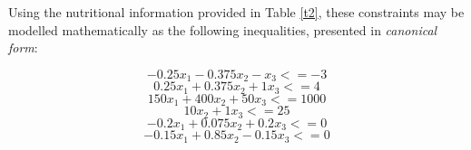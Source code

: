 \documentclass[11pt, a4paper]{article}
\begin{document}
    Using the nutritional information provided in Table \ref{t2}, these constraints may be modelled mathematically as the following inequalities, presented in \textit{canonical form}:

    $$-0.25x_1 - 0.375x_2 - x_3 <= -3$$
    $$0.25x_1 + 0.375x_2 + 1x_3 <= 4$$
    $$150x_1 + 400x_2 + 50x_3 <= 1000$$
    $$10x_2 + 1x_3 <= 25$$
    $$-0.2x_1 + 0.075x_2 + 0.2x_3 <= 0$$
    $$-0.15x_1 + 0.85x_2 - 0.15x_3 <= 0$$

    
\end{document}

